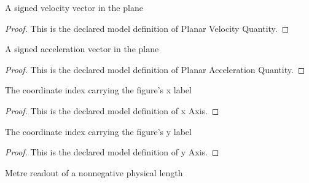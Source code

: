 \begin{definition}
  \label{def:physics:phyx-mini-0686:phyxminiproblems-problemphyxmini0686-planarvelocityquantity}
  A signed velocity vector in the plane
\end{definition}
\begin{proof}
  This is the declared model definition of Planar Velocity Quantity.
\end{proof}
\begin{definition}
  \label{def:physics:phyx-mini-0686:phyxminiproblems-problemphyxmini0686-planaraccelerationquantity}
  A signed acceleration vector in the plane
\end{definition}
\begin{proof}
  This is the declared model definition of Planar Acceleration Quantity.
\end{proof}
\begin{definition}[x Axis]
  \label{def:physics:phyx-mini-0686:phyxminiproblems-problemphyxmini0686-xaxis}
  The coordinate index carrying the figure's x label
\end{definition}
\begin{proof}
  This is the declared model definition of x Axis.
\end{proof}
\begin{definition}[y Axis]
  \label{def:physics:phyx-mini-0686:phyxminiproblems-problemphyxmini0686-yaxis}
  The coordinate index carrying the figure's y label
\end{definition}
\begin{proof}
  This is the declared model definition of y Axis.
\end{proof}
\begin{definition}
  \label{def:physics:phyx-mini-0686:phyxminiproblems-problemphyxmini0686-lengthinmeters}
  Metre readout of a nonnegative physical length
\end{definition}
